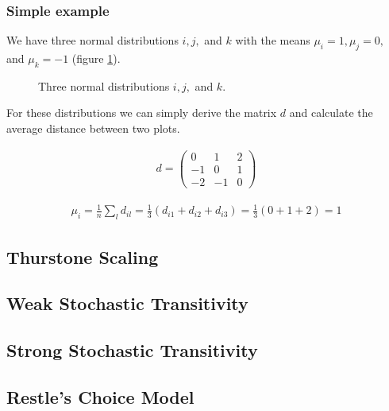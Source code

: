 \documentclass[../main/Notes.tex]{subfiles}
\begin{document}
\subsubsection*{Simple example}
We have three normal distributions $i, j,$ and $k$ with the means $\mu_i = 1, \mu_j = 0,$ and $\mu_k = -1$ (figure \ref{fig:2014-07-04-normaldists}).
\begin{figure}[htb]
  \centering
  \caption{Three normal distributions $i, j,$ and $k$.}
  \label{fig:2014-07-04-normaldists}
\end{figure}

For these distributions we can simply derive the matrix $d$ and calculate the average distance between two plots.

\begin{align*}
d = \left( \begin{array}{ccc}
 0 &  1 & 2 \\
-1 &  0 & 1 \\
-2 & -1 & 0
\end{array} \right)
\end{align*}

\begin{align*}
\mu_i = \frac{1}{n} \sum\limits_l d_{il} = \frac{1}{3} \left( d_{i1} + d_{i2} + d_{i3} \right) = \frac{1}{3} \left( 0 + 1 + 2 \right) = 1
\end{align*}



\subsection{Thurstone Scaling}

\subsection{Weak Stochastic Transitivity}

\subsection{Strong Stochastic Transitivity}

\subsection{Restle's Choice Model}
\end{document}
